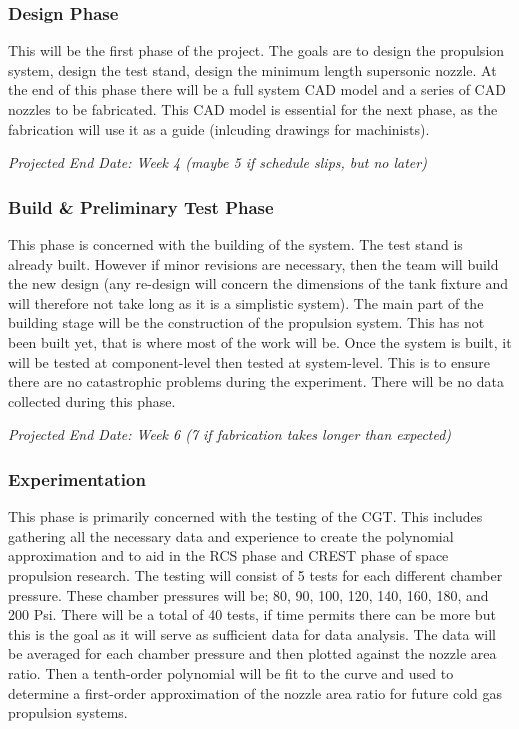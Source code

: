 \documentclass[conference]{IEEEtran} %
\begin{document}
\subsubsection{Design Phase}
\label{subsubsec: design phase}
    This will be the first phase of the project.
    The goals are to design the propulsion system, design the test stand, design the minimum length supersonic nozzle. At the end of this phase
    there will be a full system CAD model and a series of CAD nozzles to be fabricated. This CAD model is essential for the next phase, as the fabrication
    will use it as a guide (inlcuding drawings for machinists).

    \textit{Projected End Date: Week 4 (maybe 5 if schedule slips, but no later)}

\subsubsection{Build \& Preliminary Test Phase}
\label{subsubsec: sanity test phase}
    This phase is concerned with the building of the system. The test stand is already built. However if minor revisions are necessary, then the team will
    build the new design (any re-design will concern the dimensions of the tank fixture and will therefore not take long as it is a simplistic system).
    The main part of the building stage will be the construction of the propulsion system. This has not been built yet, that
    is where most of the work will be. Once the system is built, it will be tested at component-level then tested at system-level. This is to ensure there are no catastrophic
    problems during the experiment. There will be no data collected during this phase.

    \textit{Projected End Date: Week 6 (7 if fabrication takes longer than expected)}

\subsubsection{Experimentation}
\label{subsubsec:experimentation}
    This phase is primarily concerned with the testing of the CGT\@. This includes gathering all the necessary data and experience to create the
    polynomial approximation and to aid in the RCS phase and CREST phase of space propulsion research.
    The testing will consist of 5 tests for each different chamber pressure. These chamber pressures will be; 80, 90, 100, 120, 140, 160, 180, and 200 Psi. There
    will be a total of 40 tests, if time permits there can be more but this is the goal as it will serve as sufficient data for data analysis.
     The data will be averaged for each chamber pressure and then plotted against the nozzle area ratio. Then a tenth-order polynomial
    will be fit to the curve and used to determine a first-order approximation of the nozzle area ratio for future cold gas propulsion systems.
\end{document}

